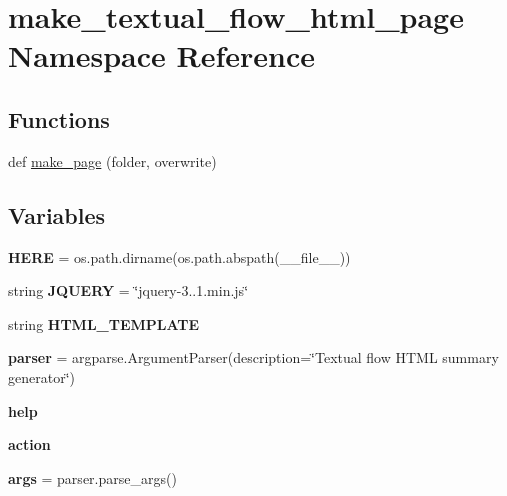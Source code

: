 \hypertarget{namespacemake__textual__flow__html__page}{}\section{make\+\_\+textual\+\_\+flow\+\_\+html\+\_\+page Namespace Reference}
\label{namespacemake__textual__flow__html__page}
\subsection*{Functions}
\begin{DoxyCompactItemize}
\item 
def \hyperlink{namespacemake__textual__flow__html__page_ac873252a13103c9454e02299b10d4b46}{make\+\_\+page} (folder, overwrite)
\end{DoxyCompactItemize}
\subsection*{Variables}
\begin{DoxyCompactItemize}
\item 
\mbox{\label{namespacemake__textual__flow__html__page_ab06f47b4ea13aa69234b309cd76e2007}} 
{\bfseries H\+E\+RE} = os.\+path.\+dirname(os.\+path.\+abspath(\+\_\+\+\_\+file\+\_\+\+\_\+))
\item 
\mbox{\label{namespacemake__textual__flow__html__page_a64830ce66454c19115cd7462ac09d077}} 
string {\bfseries J\+Q\+U\+E\+RY} = \char`\"{}jquery-\/3..\+1.min.\+js\char`\"{}
\item 
\mbox{\label{namespacemake__textual__flow__html__page_a33ed252cd2e6eb9eca50df475ebed62f}} 
string {\bfseries H\+T\+M\+L\+\_\+\+T\+E\+M\+P\+L\+A\+TE}
\item 
\mbox{\label{namespacemake__textual__flow__html__page_ad0b500a26639a050927e3ac68255e570}} 
{\bfseries parser} = argparse.\+Argument\+Parser(description=\char`\"{}Textual flow H\+T\+ML summary generator\char`\"{})
\item 
\mbox{\label{namespacemake__textual__flow__html__page_a4564734657a6579b8febafcc03d93c7a}} 
{\bfseries help}
\item 
\mbox{\label{namespacemake__textual__flow__html__page_a3158357375e23bb877f6c1baecfaeab3}} 
{\bfseries action}
\item 
\mbox{\label{namespacemake__textual__flow__html__page_a30689f2be20f9d542e3286f0ba91eec3}} 
{\bfseries args} = parser.\+parse\+\_\+args()
\end{DoxyCompactItemize}


